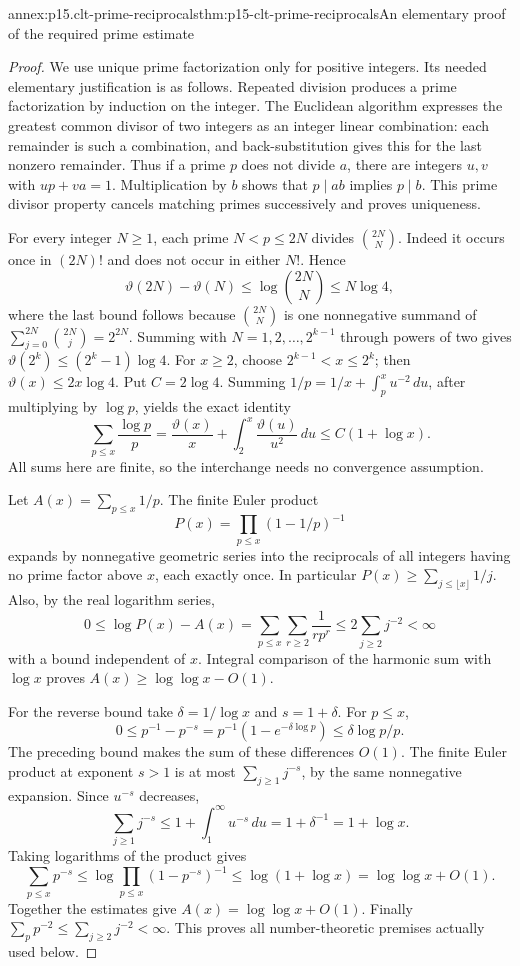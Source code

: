 \begin{annexitem}{annex:p15.clt-prime-reciprocals}{thm:p15-clt-prime-reciprocals}{An elementary proof of the required prime estimate}
\begin{proof}
We use unique prime factorization only for positive integers.
Its needed elementary justification is as follows. Repeated division
produces a prime factorization by induction on the integer. The
Euclidean algorithm expresses the greatest common divisor of two
integers as an integer linear combination: each remainder is such
a combination, and back-substitution gives this for the last nonzero
remainder. Thus if a prime \(p\) does not divide \(a\), there are
integers \(u,v\) with \(up+va=1\). Multiplication by \(b\)
shows that \(p\mid ab\) implies \(p\mid b\). This prime divisor
property cancels matching primes successively and proves uniqueness.

For every integer \(N\geq1\), each prime \(N<p\leq2N\)
divides \(\binom{2N}{N}\). Indeed it occurs once in \((2N)!\)
and does not occur in either \(N!\). Hence
\[
 \vartheta(2N)-\vartheta(N)
 \leq\log\binom{2N}{N}\leq N\log4,
 \]
where the last bound follows because \(\binom{2N}{N}\)
is one nonnegative summand of
\(\sum_{j=0}^{2N}\binom{2N}{j}=2^{2N}\).
Summing with \(N=1,2,\ldots,2^{k-1}\) through powers of two
gives \(\vartheta(2^k)\leq(2^k-1)\log4\).
For \(x\geq2\), choose \(2^{k-1}<x\leq2^k\); then
\(\vartheta(x)\leq2x\log4\).
Put \(C=2\log4\). Summing
\(1/p=1/x+\int_p^x u^{-2}\,du\), after multiplying by
\(\log p\), yields the exact identity
\[
 \sum_{p\leq x}\frac{\log p}{p}
 =\frac{\vartheta(x)}x+\int_2^x\frac{\vartheta(u)}{u^2}\,du
 \leq C(1+\log x).
 \]
All sums here are finite, so the interchange needs no convergence
assumption.

Let \(A(x)=\sum_{p\leq x}1/p\). The finite Euler product
\[
 P(x)=\prod_{p\leq x}(1-1/p)^{-1}
 \]
expands by nonnegative geometric series into the reciprocals
of all integers having no prime factor above \(x\), each exactly
once. In particular \(P(x)\geq\sum_{j\leq\lfloor x\rfloor}1/j\).
Also, by the real logarithm series,
\[
 0\leq\log P(x)-A(x)
 =\sum_{p\leq x}\sum_{r\geq2}\frac1{rp^r}
 \leq2\sum_{j\geq2}j^{-2}<\infty
 \]
with a bound independent of \(x\). Integral comparison of
the harmonic sum with \(\log x\) proves
\(A(x)\geq\log\log x-O(1)\).

For the reverse bound take \(\delta=1/\log x\) and \(s=1+\delta\).
For \(p\leq x\),
\[
 0\leq p^{-1}-p^{-s}
 =p^{-1}(1-e^{-\delta\log p})
 \leq\delta\log p/p.
 \]
The preceding bound makes the sum of these differences \(O(1)\).
The finite Euler product at exponent \(s>1\) is at most
\(\sum_{j\geq1}j^{-s}\), by the same nonnegative expansion.
Since \(u^{-s}\) decreases,
\[
 \sum_{j\geq1}j^{-s}\leq1+\int_1^\infty u^{-s}\,du
                           =1+\delta^{-1}=1+\log x.
 \]
Taking logarithms of the product gives
\[
 \sum_{p\leq x}p^{-s}
 \leq\log\prod_{p\leq x}(1-p^{-s})^{-1}
 \leq\log(1+\log x)=\log\log x+O(1).
 \]
Together the estimates give \(A(x)=\log\log x+O(1)\).
Finally \(\sum_pp^{-2}\leq\sum_{j\geq2}j^{-2}<\infty\).
This proves all number-theoretic premises actually used below.
\end{proof}
\end{annexitem}

